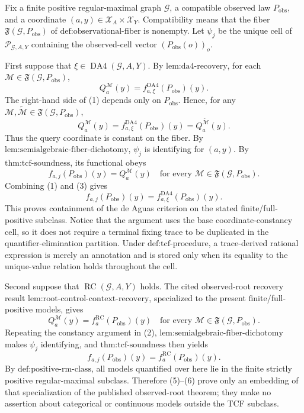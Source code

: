 Fix a finite positive regular-maximal graph \(\mathcal G\), a compatible observed law \(P_{\mathrm{obs}}\), and a coordinate \((a,y)\in\mathcal X_A\times\mathcal X_Y\). Compatibility means that the fiber \(\mathfrak F(\mathcal G,P_{\mathrm{obs}})\) of \(\text{def:observational-fiber}\) is nonempty. Let \(\psi_j\) be the unique cell of \(\mathscr P_{\mathcal G,A,Y}\) containing the observed-cell vector \((P_{\mathrm{obs}}(o))_o\).

First suppose that \(\xi\in\operatorname{DA4}(\mathcal G,A,Y)\). By \(\text{lem:da4-recovery}\), for each \(\mathcal M\in\mathfrak F(\mathcal G,P_{\mathrm{obs}})\),
\[
Q_a^{\mathcal M}(y)=f^{\mathrm{DA4}}_{a,\xi}(P_{\mathrm{obs}})(y).
\tag{1}
\]
The right-hand side of (1) depends only on \(P_{\mathrm{obs}}\). Hence, for any \(\mathcal M,\widetilde{\mathcal M}\in\mathfrak F(\mathcal G,P_{\mathrm{obs}})\),
\[
Q_a^{\mathcal M}(y)
=f^{\mathrm{DA4}}_{a,\xi}(P_{\mathrm{obs}})(y)
=Q_a^{\widetilde{\mathcal M}}(y).
\tag{2}
\]
Thus the query coordinate is constant on the fiber. By \(\text{lem:semialgebraic-fiber-dichotomy}\), \(\psi_j\) is identifying for \((a,y)\). By \(\text{thm:tcf-soundness}\), its functional obeys
\[
f_{a,j}(P_{\mathrm{obs}})(y)=Q_a^{\mathcal M}(y)
\quad\text{for every }\mathcal M\in\mathfrak F(\mathcal G,P_{\mathrm{obs}}).
\tag{3}
\]
Combining (1) and (3) gives
\[
f_{a,j}(P_{\mathrm{obs}})(y)
=f^{\mathrm{DA4}}_{a,\xi}(P_{\mathrm{obs}})(y).
\tag{4}
\]
This proves containment of the de Aguas criterion on the stated finite/full-positive subclass. Notice that the argument uses the base coordinate-constancy cell, so it does not require a terminal fixing trace to be duplicated in the quantifier-elimination partition. Under \(\text{def:tcf-procedure}\), a trace-derived rational expression is merely an annotation and is stored only when its equality to the unique-value relation holds throughout the cell.

Second suppose that \(\operatorname{RC}(\mathcal G,A,Y)\) holds. The cited observed-root recovery result \(\text{lem:root-control-context-recovery}\), specialized to the present finite/full-positive models, gives
\[
Q_a^{\mathcal M}(y)=f_a^{\mathrm{RC}}(P_{\mathrm{obs}})(y)
\quad\text{for every }\mathcal M\in\mathfrak F(\mathcal G,P_{\mathrm{obs}}).
\tag{5}
\]
Repeating the constancy argument in (2), \(\text{lem:semialgebraic-fiber-dichotomy}\) makes \(\psi_j\) identifying, and \(\text{thm:tcf-soundness}\) then yields
\[
f_{a,j}(P_{\mathrm{obs}})(y)=f_a^{\mathrm{RC}}(P_{\mathrm{obs}})(y).
\tag{6}
\]
By \(\text{def:positive-rm-class}\), all models quantified over here lie in the finite strictly positive regular-maximal subclass. Therefore (5)--(6) prove only an embedding of that specialization of the published observed-root theorem; they make no assertion about categorical or continuous models outside the TCF subclass.

